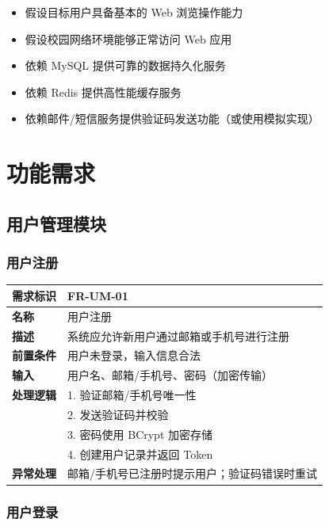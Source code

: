 \documentclass[12pt,a4paper,UTF8]{ctexart}
\begin{document}
\begin{itemize}[itemsep=3pt]
    \item 假设目标用户具备基本的 Web 浏览操作能力
    \item 假设校园网络环境能够正常访问 Web 应用
    \item 依赖 MySQL 提供可靠的数据持久化服务
    \item 依赖 Redis 提供高性能缓存服务
    \item 依赖邮件/短信服务提供验证码发送功能（或使用模拟实现）
\end{itemize}

\section{功能需求}

\subsection{用户管理模块}

\subsubsection{用户注册}

\begin{longtable}{p{}|p{}}
    \toprule
    \textbf{需求标识} & FR-UM-01 \\
    \midrule
    \textbf{名称} & 用户注册 \\
    \midrule
    \textbf{描述} & 系统应允许新用户通过邮箱或手机号进行注册 \\
    \midrule
    \textbf{前置条件} & 用户未登录，输入信息合法 \\
    \midrule
    \textbf{输入} & 用户名、邮箱/手机号、密码（加密传输） \\
    \midrule
    \textbf{处理逻辑} & 
    1. 验证邮箱/手机号唯一性 \\
    & 2. 发送验证码并校验 \\
    & 3. 密码使用 BCrypt 加密存储 \\
    & 4. 创建用户记录并返回 Token \\
    \midrule
    \textbf{异常处理} & 邮箱/手机号已注册时提示用户；验证码错误时重试 \\
    \bottomrule
\end{longtable}

\subsubsection{用户登录}
\end{document}
